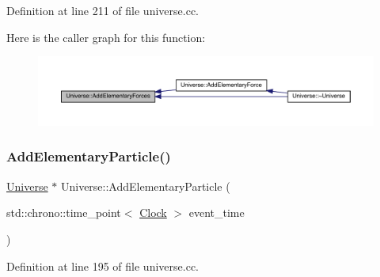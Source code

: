 Definition at line 211 of file universe.\+cc.

Here is the caller graph for this function\+:
\nopagebreak
\begin{figure}[H]
\begin{center}
\leavevmode
\includegraphics[width=350pt]{class_universe_a81d294300346e9f901836ab609cce942_icgraph}
\end{center}
\end{figure}
\mbox{\label{class_universe_ab9c84e0576de50aa4fa46655832ce5e4}} 
\subsubsection{\texorpdfstring{Add\+Elementary\+Particle()}{AddElementaryParticle()}}
{\footnotesize\ttfamily \hyperlink{class_universe}{Universe} $\ast$ Universe\+::\+Add\+Elementary\+Particle (\begin{DoxyParamCaption}\item[{std\+::chrono\+::time\+\_\+point$<$ \hyperlink{universe_8h_a0ef8d951d1ca5ab3cfaf7ab4c7a6fd80}{Clock} $>$}]{event\+\_\+time }\end{DoxyParamCaption})}



Definition at line 195 of file universe.\+cc.

